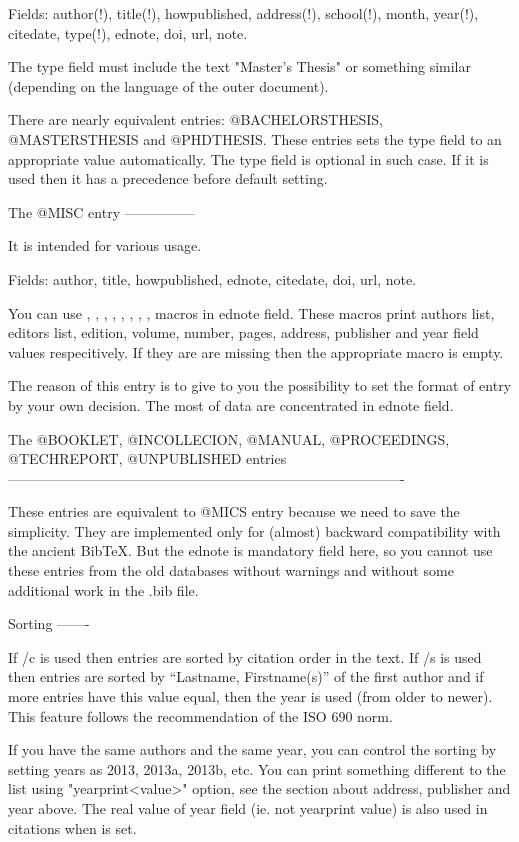Fields: author(!), title(!), howpublished, address(!), school(!), 
month, year(!), citedate, type(!), ednote, doi, url, note. 

The type field must include the text "Master's Thesis" or something 
similar (depending on the language of the outer document).

There are nearly equivalent entries: @BACHELORSTHESIS, @MASTERSTHESIS and
@PHDTHESIS. These entries sets the type field to an appropriate value
automatically. The type field is optional in such case. If it is used then
it has a precedence before default setting.


The @MISC entry
---------------

It is intended for various usage. 

Fields: author, title, howpublished, ednote, citedate, doi, url, note. 

You can use \AU, \ED, \EDN, \VOL, \NO, \PP, \ADDR, \PUBL, \YEAR
macros in ednote field. These macros print authors list, editors list,
edition, volume, number, pages, address, publisher and year field values
respecitively. If they are are missing then the appropriate macro is empty.

The reason of this entry is to give to you the possibility to set the format of
entry by your own decision. The most of data are concentrated in ednote
field.


The @BOOKLET, @INCOLLECION, @MANUAL, @PROCEEDINGS, @TECHREPORT, @UNPUBLISHED entries
-------------------------------------------------------------------------------------

These entries are equivalent to @MICS entry because we need to save the
simplicity. They are implemented only for (almost) backward compatibility
with the ancient BibTeX. But the ednote is mandatory field here, so you
cannot use these entries from the old databases without warnings and without 
some additional work in the .bib file.


Sorting
-------

If \usebib/c is used then entries are sorted by citation order in the text.
If \usebib/s is used then entries are sorted by ``Lastname, Firstname(s)'' of
the first author and if more entries have this value equal, then the year is
used (from older to newer). This feature follows the recommendation of the
ISO 690 norm.

If you have the same authors and the same year, you can control the sorting
by setting years as 2013, 2013a, 2013b, etc. You can print something
different to the list using "yearprint{<value>}" option, see the section about
address, publisher and year above. The real value of year field (ie. not
yearprint value) is also used in citations when \nonumcitations is set.

